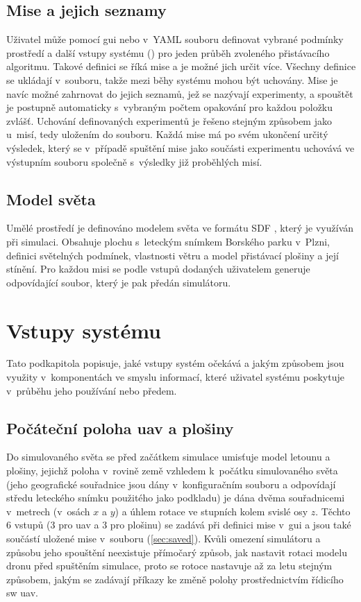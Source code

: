     \subsection{Mise a jejich seznamy}
      Uživatel může pomocí \acrshort{gui} nebo v~YAML souboru definovat vybrané podmínky prostředí a další vstupy systému () pro jeden průběh zvoleného přistávacího algoritmu. Takové definici se říká mise a je možné jich určit více. Všechny definice se ukládají v~souboru, takže mezi běhy systému mohou být uchovány. Mise je navíc možné zahrnovat do jejich seznamů, jež se nazývají experimenty, a spouštět je postupně automaticky s~vybraným počtem opakování pro každou položku zvlášť. Uchování definovaných experimentů je řešeno stejným způsobem jako u~misí, tedy uložením do souboru. Každá mise má po svém ukončení určitý výsledek, který se v~případě spuštění mise jako součásti experimentu uchovává ve výstupním souboru společně s~výsledky již proběhlých misí.
    \subsection{Model světa}
      Umělé prostředí je definováno modelem světa ve formátu SDF \cite{sdf}, který je využíván při simulaci. Obsahuje plochu s~leteckým snímkem Borského parku v~Plzni, definici světelných podmínek, vlastnosti větru a model přistávací plošiny a její stínění. Pro každou misi se podle vstupů dodaných uživatelem generuje odpovídající soubor, který je pak předán simulátoru.

  \section{Vstupy systému} \label{sec:inputs}
  Tato podkapitola popisuje, jaké vstupy systém očekává a jakým způsobem jsou využity v~komponentách ve smyslu informací, které uživatel systému poskytuje v~průběhu jeho používání nebo předem.
    \subsection{Počáteční poloha \acrshort{uav} a plošiny}
      Do simulovaného světa se před začátkem simulace umisťuje model letounu a plošiny, jejichž poloha v~rovině země vzhledem k~počátku simulovaného světa (jeho geografické souřadnice jsou dány v~konfiguračním souboru a odpovídají středu leteckého snímku použitého jako podkladu) je dána dvěma souřadnicemi v~metrech (v~osách $x$ a $y$) a úhlem rotace ve stupních kolem svislé osy $z$. Těchto 6 vstupů (3 pro \acrshort{uav} a 3 pro plošinu) se zadává při definici mise v~\acrshort{gui} a jsou také součástí uložené mise v~souboru (\cref{sec:saved}). Kvůli omezení simulátoru a způsobu jeho spouštění neexistuje přímočarý způsob, jak nastavit rotaci modelu dronu před spuštěním simulace, proto se rotoce nastavuje až za letu stejným způsobem, jakým se zadávají příkazy ke změně polohy prostřednictvím řídicího \acrshort{sw} \acrshort{uav}.
